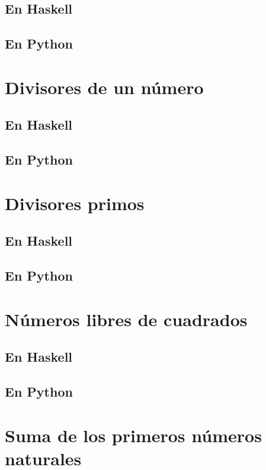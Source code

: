 \documentclass[a4paper,12pt,twoside]{book}
\begin{document}
\subsection*{En Haskell}
\subsection*{En Python}

\section{Divisores de un número}
\subsection*{En Haskell}
\subsection*{En Python}

\section{Divisores primos}
\subsection*{En Haskell}
\subsection*{En Python}

\section{Números libres de cuadrados}
\subsection*{En Haskell}
\subsection*{En Python}

\section{Suma de los primeros números naturales}
\end{document}
